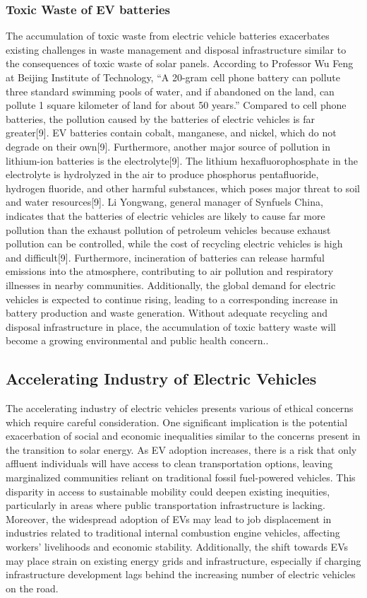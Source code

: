\documentclass[10pt,twocolumn]{article}
\begin{document}
\subsubsection{Toxic Waste of EV batteries}
The accumulation of toxic waste from electric vehicle batteries exacerbates existing challenges in waste management and disposal infrastructure similar to the consequences of toxic waste of solar panels. According to Professor Wu Feng at Beijing Institute of Technology, “A 20-gram cell phone battery can pollute three standard swimming pools of water, and if abandoned on the land, can pollute 1 square kilometer of land for about 50 years.” Compared to cell phone batteries, the pollution caused by the batteries of electric vehicles is far greater[9]. EV batteries contain cobalt, manganese, and nickel, which do not degrade on their own[9]. Furthermore, another major source of pollution in lithium-ion batteries is the electrolyte[9]. The lithium hexafluorophosphate in the electrolyte is hydrolyzed in the air to produce phosphorus pentafluoride, hydrogen fluoride, and other harmful substances, which poses major threat to soil and water resources[9]. Li Yongwang, general manager of Synfuels China, indicates that the batteries of electric vehicles are likely to cause far more pollution than the exhaust pollution of petroleum vehicles because exhaust pollution can be controlled, while the cost of recycling electric vehicles is high and difficult[9]. Furthermore, incineration of batteries can release harmful emissions into the atmosphere, contributing to air pollution and respiratory illnesses in nearby communities. Additionally, the global demand for electric vehicles is expected to continue rising, leading to a corresponding increase in battery production and waste generation. Without adequate recycling and disposal infrastructure in place, the accumulation of toxic battery waste will become a growing environmental and public health concern..
 
\subsection{Accelerating Industry of Electric Vehicles}
The accelerating industry of electric vehicles presents various of ethical concerns which require careful consideration. One significant implication is the potential exacerbation of social and economic inequalities similar to the concerns present in the transition to solar energy. As EV adoption increases, there is a risk that only affluent individuals will have access to clean transportation options, leaving marginalized communities reliant on traditional fossil fuel-powered vehicles. This disparity in access to sustainable mobility could deepen existing inequities, particularly in areas where public transportation infrastructure is lacking. Moreover, the widespread adoption of EVs may lead to job displacement in industries related to traditional internal combustion engine vehicles, affecting workers' livelihoods and economic stability. Additionally, the shift towards EVs may place strain on existing energy grids and infrastructure, especially if charging infrastructure development lags behind the increasing number of electric vehicles on the road. 
\end{document}
